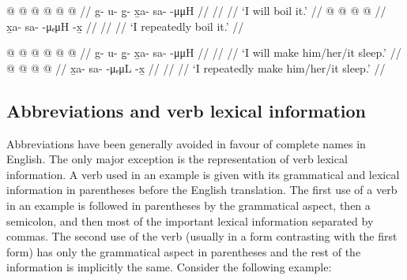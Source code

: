 \begin{multicols}{2}
\pex\label{ex:intro-root-ta}%
\a\label{ex:intro-root-ta-uuH}%
\begingl
	\gla	{} @ {} @ {} @ {} @ {} @ {} @ {} //
	\glb	g- u- g̱- x̱a- sa-  -μμH //
	\glc	{}\· \· \· \· \·  \· //
	\gld	{} {} {} {} {} {} {} //
	\glft	‘I will boil it.’
		//
\endgl
\a\label{ex:intro-root-ta-ueuH}%
\begingl
	\gla	{} @ {} @ {} @ {} @ {} //
	\glb	x̱a- sa-  -μₑμH -x̱ //
	\glc	{}\· \·  \· \· //
	\gld	{} {} {} {} {} //
	\glft	‘I repeatedly boil it.’
		//
\endgl
\xe

\pex\label{ex:intro-root-taL}%
\a\label{ex:intro-root-taL-uuH}%
\begingl
	\gla	{} @ {} @ {} @ {} @ {} @ {} @ {} //
	\glb	g- u- g̱- x̱a- sa-  -μμH //
	\glc	{}\· \· \· \· \·  \· //
	\gld	{} {} {} {} {} {} {} //
	\glft	‘I will make him/her/it sleep.’
		//
\endgl
\a\label{ex:intro-root-taL-ueuL}%
\begingl
	\gla	{} @ {} @ {} @ {} @ {} //
	\glb	x̱a- sa-  -μₑμL -x̱ //
	\glc	{}\· \·  \· \· //
	\gld	{} {} {} {} {} //
	\glft	‘I repeatedly make him/her/it sleep.’
		//
\endgl
\xe
\end{multicols}

\subsection{Abbreviations and verb lexical information}\label{sec:intro-abbrev}

Abbreviations have been generally avoided in favour of complete names in English.
The only major exception is the representation of verb lexical information.
A verb used in an example is given with its grammatical and lexical information in parentheses before the English translation.
The first use of a verb in an example is followed in parentheses by the grammatical aspect, then a semicolon, and then most of the important lexical information separated by commas. The second use of the verb (usually in a form contrasting with the first form) has only the grammatical aspect in parentheses and the rest of the information is implicitly the same.
Consider the following example:

